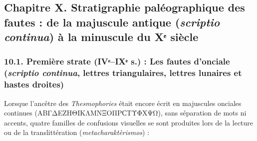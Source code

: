 \documentclass[11pt, a4paper, twoside]{article}
\renewcommand{\_}{\origunderscore\penalty0\relax}
\renewcommand{\texttt}[1]{#1}
\begin{document}
\subsection{Chapitre X. Stratigraphie paléographique des fautes : de la majuscule antique (\textit{scriptio continua}) à la minuscule du Xᵉ siècle}


\subsubsection{10.1. Première strate (IVᵉ–IXᵉ s.) : Les fautes d'onciale (\textit{scriptio continua}, lettres triangulaires, lettres lunaires et hastes droites)}

Lorsque l'ancêtre des \textit{Thesmophories} était encore écrit en majuscules onciales continues (\texttt{ΑΒΓΔΕΖΗΘΙΚΛΜ\allowbreak ΝΞΟΠΡϹΤΥΦΧΨΩ}), sans séparation de mots ni accents, quatre familles de confusions visuelles se sont produites lors de la lecture ou de la translittération (\textit{metacharaktèrismos}) :
\end{document}
